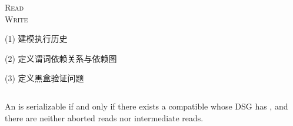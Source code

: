 
\begin{frame}{}
	\begin{center}

		\vspace{0.50cm}
		\textsc{Read} \\[6pt]
		\textsc{Write} \\[6pt]
	\end{center}
\end{frame}

\begin{frame}{}
	\begin{center}
		(1) 建模执行历史
	\end{center}
\end{frame}

\begin{frame}{}
	\begin{center}
		(2) 定义谓词依赖关系与依赖图

		\pause
	\end{center}
\end{frame}

\begin{frame}{}
	\begin{center}
		(3) 定义黑盒验证问题
	\end{center}
	\begin{columns}
		  \pause
			\begin{theorem}
				An  is serializable if and only if
				there exists a compatible 
				whose DSG has , and there are neither
				aborted reads nor intermediate reads.
			\end{theorem}
			\pause
			\begin{center}
			\end{center}
	\end{columns}
\end{frame}

